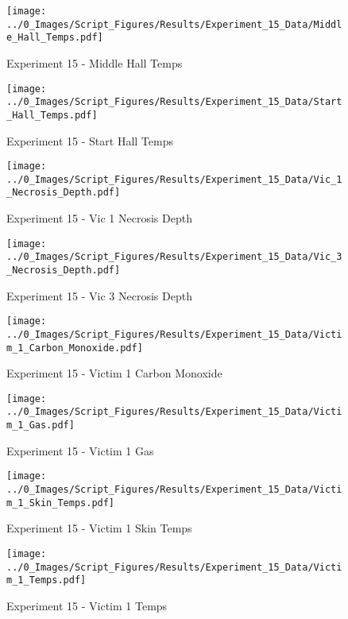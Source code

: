 	\begin{figure}[H]
		\centering
		\texttt{[image: ../0\_Images/Script\_Figures/Results/Experiment\_15\_Data/Middle\_Hall\_Temps.pdf]}
		\caption[]{Experiment 15 - Middle Hall Temps}
	\end{figure}
 
	\clearpage

	\begin{figure}[H]
		\centering
		\texttt{[image: ../0\_Images/Script\_Figures/Results/Experiment\_15\_Data/Start\_Hall\_Temps.pdf]}
		\caption[]{Experiment 15 - Start Hall Temps}
	\end{figure}
 

	\begin{figure}[H]
		\centering
		\texttt{[image: ../0\_Images/Script\_Figures/Results/Experiment\_15\_Data/Vic\_1\_Necrosis\_Depth.pdf]}
		\caption[]{Experiment 15 - Vic 1 Necrosis Depth}
	\end{figure}
 
	\clearpage

	\begin{figure}[H]
		\centering
		\texttt{[image: ../0\_Images/Script\_Figures/Results/Experiment\_15\_Data/Vic\_3\_Necrosis\_Depth.pdf]}
		\caption[]{Experiment 15 - Vic 3 Necrosis Depth}
	\end{figure}
 

	\begin{figure}[H]
		\centering
		\texttt{[image: ../0\_Images/Script\_Figures/Results/Experiment\_15\_Data/Victim\_1\_Carbon\_Monoxide.pdf]}
		\caption[]{Experiment 15 - Victim 1 Carbon Monoxide}
	\end{figure}
 
	\clearpage

	\begin{figure}[H]
		\centering
		\texttt{[image: ../0\_Images/Script\_Figures/Results/Experiment\_15\_Data/Victim\_1\_Gas.pdf]}
		\caption[]{Experiment 15 - Victim 1 Gas}
	\end{figure}
 

	\begin{figure}[H]
		\centering
		\texttt{[image: ../0\_Images/Script\_Figures/Results/Experiment\_15\_Data/Victim\_1\_Skin\_Temps.pdf]}
		\caption[]{Experiment 15 - Victim 1 Skin Temps}
	\end{figure}
 
	\clearpage

	\begin{figure}[H]
		\centering
		\texttt{[image: ../0\_Images/Script\_Figures/Results/Experiment\_15\_Data/Victim\_1\_Temps.pdf]}
		\caption[]{Experiment 15 - Victim 1 Temps}
	\end{figure}
 

